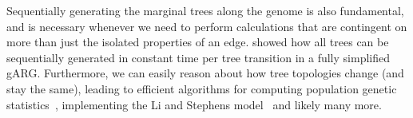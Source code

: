 \documentclass{article}
\begin{document}
Sequentially generating the marginal trees along the genome
is also fundamental, and is necessary whenever we need to
perform calculations that are contingent on more than just the
isolated properties of an edge. \cite{kelleher2016efficient}
showed how all trees can be sequentially generated in
constant time per tree transition in a fully simplified gARG.
Furthermore, we can easily reason about how tree topologies
change (and stay the same), leading to efficient algorithms
for computing population genetic
statistics~\citep{kelleher2016efficient,kelleher2018efficient},
implementing the Li and Stephens
model~\citep{kelleher2019inferring,wohns2022unified}
and likely many more.





\end{document}
